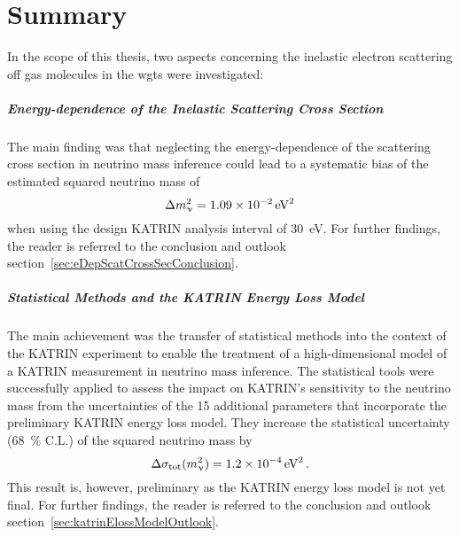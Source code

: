 \chapter{Summary}
\label{sec:conclusion}
In the scope of this thesis, two aspects concerning the inelastic electron scattering off gas molecules in the \gls{wgts} were investigated:

\paragraph{Energy-dependence of the Inelastic Scattering Cross Section}
The main finding was that neglecting the energy-dependence of the scattering cross section in neutrino mass inference could lead to a systematic bias of the estimated squared neutrino mass of
\begin{equation*}
\Delta m_\upnu^2 = \SI{1.09e-2}{eV^2}
\end{equation*}
when using the design KATRIN analysis interval of \SI{30}{eV}. For further findings, the reader is referred to the conclusion and outlook section~\ref{sec:eDepScatCrossSecConclusion}.


\paragraph{Statistical Methods and the KATRIN Energy Loss Model}
The main achievement was the transfer of statistical methods into the context of the KATRIN experiment to enable the treatment of a high-dimensional model of a KATRIN measurement in neutrino mass inference. The statistical tools were successfully applied to assess the impact on KATRIN's sensitivity to the neutrino mass from the uncertainties of the 15 additional parameters that incorporate the preliminary KATRIN energy loss model. They increase the statistical uncertainty (\SI{68}{\percent} C.L.) of the squared neutrino mass by
\begin{equation*}
\Delta \sigma_\mathrm{tot}(m_\upnu^2) = \SI{1.2e-4}{eV^2}
\text{\,.} 
\end{equation*} 
This result is, however, preliminary as the KATRIN energy loss model is not yet final. For further findings, the reader is referred to the conclusion and outlook section~\ref{sec:katrinElossModelOutlook}.
